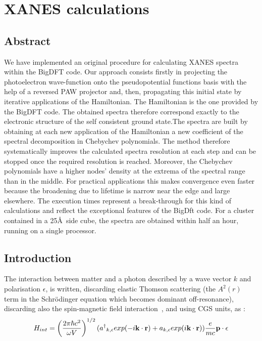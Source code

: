 \documentclass[a4paper,11pt]{report}
\begin{document}
\chapter{XANES calculations}

\section{Abstract} 
We have implemented an original procedure for calculating XANES spectra within the BigDFT code. Our approach consists firstly in  projecting the photoelectron wave-function onto the pseudopotential functions basis with the help of a reversed PAW projector\cite{Taillefumier} and, then, propagating this initial state by iterative applications of the Hamiltonian. The Hamiltonian is the one provided by the BigDFT code. The obtained spectra therefore correspond exactly to the electronic structure of the self consistent ground state.The spectra are built by obtaining at each new application of the Hamiltonian a new coefficient of the spectral decomposition in Chebychev polynomials. The method therefore systematically improves the calculated spectra resolution at each step and can be stopped once the required resolution is reached. Moreover, the Chebychev polynomials have a higher nodes' density at the extrema of the spectral range  than in the middle. For practical applications this makes convergence even faster because the broadening due to lifetime is narrow near the edge and large elsewhere. The execution times represent a break-through for this kind of calculations and reflect the exceptional features of the BigDft code. For a cluster contained in a 25\AA\ side cube, the spectra are obtained within half an hour, running on a single processor.


\section{Introduction}

The interaction between matter and a photon described by a wave vector ${ k}$ and polarisation ${ \epsilon}$,
  is written, discarding elastic Thomson scattering (the $ A^2(r)$ term in the Schr{\"o}dinger equation which becomes dominant off-resonance), discarding also the spin-magnetic field interaction~\cite{blume}, and using CGS units,  as :
\begin{equation}
H_{int} =
 \left( 
   \displaystyle \frac{2 \pi \hbar c^2 }{ \omega V}\right)^{1/2}
   ({  a^\dagger }_{ k,\epsilon} exp(-i {{\bf k} \cdot {\bf r}} ) 
    + a_{k ,\epsilon} exp(i { {\bf k} \cdot {\bf  r}} ))\frac{e}{ m c} {  {\bf p} \cdot  {\bf \epsilon} } \label{fondamentale}
\end{equation}
\end{document}
